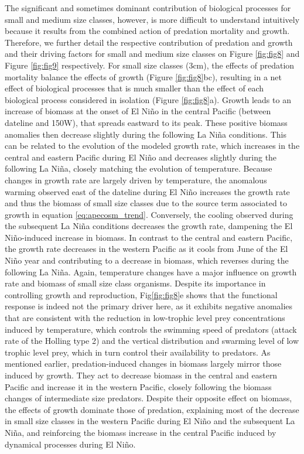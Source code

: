 The significant and sometimes dominant contribution of biological processes for small and medium size classes, however, is more difficult to understand intuitively because it results from the combined action of predation mortality and growth. Therefore, we further detail the respective contribution of predation and growth and their driving factors for small and medium size classes on Figure \ref{fig:fig8} and Figure \ref{fig:fig9} respectively. For small size classes (3cm), the effects of predation mortality balance the effects of growth (Figure \ref{fig:fig8}bc), resulting in a net effect of biological processes that is much smaller than the effect of each biological process considered in isolation (Figure \ref{fig:fig8}a). Growth leads to an increase  of biomass at the onset of El Niño in the central Pacific (between dateline and 150\degree{}W), that spreads eastward to its peak. These positive biomass anomalies then decrease slightly during the following La Niña conditions. This can be related to the evolution of the modeled growth rate, which increases in the central and eastern Pacific during El Niño and decreases slightly during the following La Niña, closely matching the evolution of temperature. Because changes in growth rate are largely driven by temperature, the anomalous warming observed east of the dateline during El Niño increases the growth rate and thus the biomass of small size classes due to the source term associated to growth in equation \ref{eq:apecosm_trend}. Conversely, the cooling observed during the subsequent La Niña conditions decreases the growth rate, dampening the El Niño-induced increase in biomass. In contrast to the central and eastern Pacific, the growth rate decreases in the western Pacific as it cools from June of the El Niño year and  contributing to a decrease in biomass, which reverses during the following La Niña. Again, temperature changes have a major influence on growth rate and biomass of small size class organisms. Despite its importance in controlling growth and reproduction, Fig\ref{fig:fig8}e shows that the functional response is indeed not the primary driver here, as it exhibits negative anomalies that are consistent with the reduction in low-trophic level prey concentrations induced by temperature, which controls the swimming speed of predators (attack rate of the Holling type 2) and the vertical distribution and swarming level of low trophic level prey, which in turn control their availability to predators. As mentioned earlier, predation-induced changes in biomass largely mirror those induced by growth. They act to decrease biomass in the central and eastern Pacific and increase it in the western Pacific, closely following the biomass changes of intermediate size predators. Despite their opposite effect on biomass, the effects of growth dominate those of predation, explaining most of the decrease in small size classes in the western Pacific during El Niño and the subsequent La Niña, and reinforcing the biomass increase in the central Pacific induced by dynamical processes during El Niño.  

